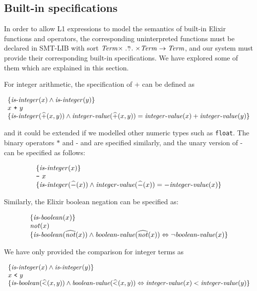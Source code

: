\subsection{Built-in specifications}

In order to allow L1 expressions to model the semantics of built-in Elixir
functions and operators, the corresponding uninterpreted functions must be
declared in SMT-LIB with sort $\mathit{Term} \times \stackrel{n}{\dots} \times \mathit{Term}
\rightarrow \mathit{Term}$, and our system must provide their corresponding built-in
specifications. We have explored some of them which are explained in this
section.

For integer arithmetic, the specification of $\texttt{+}$ can be defined as

\[
\begin{array}{l}
\{ \mathit{is\mbox{-}integer}(x) \wedge \mathit{is\mbox{-}integer}(y) \}\\
x~\texttt{+}~y\\
\{ \mathit{is\mbox{-}integer}(\widehat{+}(x, y)) \wedge 
  \mathit{integer\mbox{-}value}(\widehat{+}(x, y)) = \mathit{integer\mbox{-}value}(x) + \mathit{integer\mbox{-}value}(y) \}
\end{array}
\]

and it could be extended if we modelled other numeric types such as
\verb|float|. The binary operators $\texttt{*}$ and $\texttt{-}$ and are
specified similarly, and the unary version of $\texttt{-}$ can be specified as
follows:

\[
\begin{array}{l}
\{ \mathit{is\mbox{-}integer}(x) \}\\
\texttt{-}~x\\
\{ \mathit{is\mbox{-}integer}(\widehat{-}(x)) \wedge 
  \mathit{integer\mbox{-}value}(\widehat{-}(x)) = -\mathit{integer\mbox{-}value}(x) \}
\end{array}
\]

Similarly, the Elixir boolean negation can be specified as:

\[
\begin{array}{l}
\{ \mathit{is\mbox{-}boolean}(x) \}\\
\mathit{not}(x)\\
\{ \mathit{is\mbox{-}boolean}(\widehat{\mathit{not}}(x)) \wedge 
  \mathit{boolean\mbox{-}value}(\widehat{\mathit{not}}(x)) \Leftrightarrow \neg\mathit{boolean\mbox{-}value}(x) \}
\end{array}
\]

We have only provided the comparison for integer terms as

\[
\begin{array}{l}
\{ \mathit{is\mbox{-}integer}(x) \wedge \mathit{is\mbox{-}integer}(y) \}\\
x~\texttt{<}~y\\
\{ \mathit{is\mbox{-}boolean}(\widehat{<}(x, y)) \wedge 
  \mathit{boolean\mbox{-}value}(\widehat{<}(x, y)) \Leftrightarrow \mathit{integer\mbox{-}value}(x) < \mathit{integer\mbox{-}value}(y) \}
\end{array}
\]

